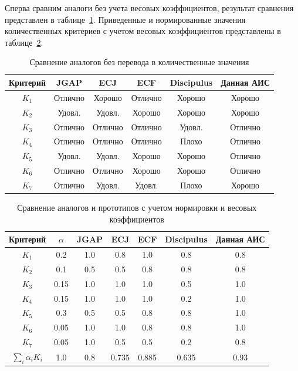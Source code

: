 \documentclass[russian,utf8,emptystyle]{eskdtext}
\begin{document}
Сперва сравним аналоги без учета весовых коэффициентов, результат сравнения представлен в таблице~\ref{tab:analog_compare_phase1}. Приведенные и нормированные значения количественных критериев с учетом весовых коэффициентов представлены в таблице~\ref{tab:analog_compare_phase2}.

\begin{table}
\centering
\caption{Сравнение аналогов без перевода в количественные значения}
\label{tab:analog_compare_phase1}
\begin{tabular}{c|c|c|c|c|c}
Критерий & JGAP & ECJ & ECF & Discipulus & Данная АИС \\ 
\hline 
$K_1$ & Отлично & Хорошо & Отлично & Хорошо & Хорошо \\ 
\hline 
$K_2$ & Удовл. & Удовл. & Хорошо & Хорошо & Хорошо \\ 
\hline 
$K_3$ & Отлично & Отлично & Отлично & Удовл. & Отлично \\ 
\hline 
$K_4$ & Отлично & Отлично & Отлично & Плохо & Отлично \\ 
\hline 
$K_5$ & Удовл. & Удовл. & Хорошо & Хорошо & Отлично \\ 
\hline 
$K_6$ & Отлично & Отлично & Хорошо & Хорошо & Отлично \\ 
\hline 
$K_7$ & Отлично & Удовл. & Удовл. & Плохо & Хорошо 
\end{tabular} 
\end{table}

\begin{table}
\centering
\caption{Сравнение аналогов и прототипов с учетом нормировки и весовых коэффициентов}
\label{tab:analog_compare_phase2}
\begin{tabular}{c|c|c|c|c|c|c}
Критерий & $\alpha$ & JGAP & ECJ & ECF & Discipulus & Данная АИС \\ 
\hline 
$K_1$ & 0.2 & 1.0 & 0.8 & 1.0 & 0.8 & 0.8 \\ 
\hline 
$K_2$ & 0.1 & 0.5 & 0.5 & 0.8 & 0.8 & 0.8 \\ 
\hline 
$K_3$ & 0.15 & 1.0 & 1.0 & 1.0 & 0.5 & 1.0 \\ 
\hline 
$K_4$ & 0.15 & 1.0 & 1.0 & 1.0 & 0.2 & 1.0 \\ 
\hline 
$K_5$ & 0.3 & 0.5 & 0.5 & 0.8 & 0.8 & 1.0 \\ 
\hline 
$K_6$ & 0.05 & 1.0 & 1.0 & 0.8 & 0.8 & 1.0 \\ 
\hline 
$K_7$ & 0.05 & 1.0 & 0.5 & 0.5 & 0.2 & 0.8 \\ 
\hline 
$\sum_i \alpha_i K_i$ & 1.0 & 0.8 & 0.735 & 0.885 & 0.635 & 0.93  
\end{tabular} 
\end{table}
\end{document}
